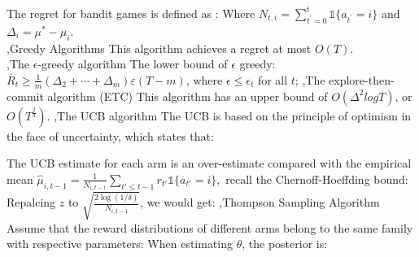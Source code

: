 \documentclass[12pt]{report}
\begin{document}
The regret for bandit games is defined as :
Where $N_{t,i}=\sum_{t^{\prime}=0}^{t}\mathbb{1}\{a_{t^{\prime}}=i\}$ and $\Delta_{i}=\mu^{*}-\mu_{i}$.\\
\sep{Greedy Algorithms}
This algorithm achieves a regret at most $O(T)$.\\
\sep{The $\epsilon$-greedy algorithm}
The lower bound of $\epsilon$ greedy: $\overline{R}_t\geq\frac1m(\Delta_2+\cdots+\Delta_m)\varepsilon(T-m)$, where $\epsilon\le \epsilon_t$ for all $t$;
\sep{The explore-then-commit algorithm (ETC)}
This algorithm has an upper bound of $O(\Delta^2 log T)$, or $O(T^{\frac{2}{3}})$.
\sep{The UCB algorithm}
The UCB is based on the principle of optimism in the face of uncertainty, which states that:
\begin{center}
\end{center}
The UCB estimate for each arm is an over-estimate compared with the empirical mean $\hat{\mu}_{i,t-1}=\frac{1}{N_{i,t-1}}\sum_{t'\le t-1}r_{t'}\mathbb{1}\{a_{t'}=i\},$ recall the Chernoff-Hoeffding bound:
Repalcing $z$ to $\sqrt{\frac{2\log(1/\delta)}{N_{i,t-1}}}$, we would get:
\sep{Thompson Sampling Algorithm}
Assume that the reward distributions of different arms belong to the same family with respective parameters:
When estimating $\theta$, the posterior is:
\end{document}
